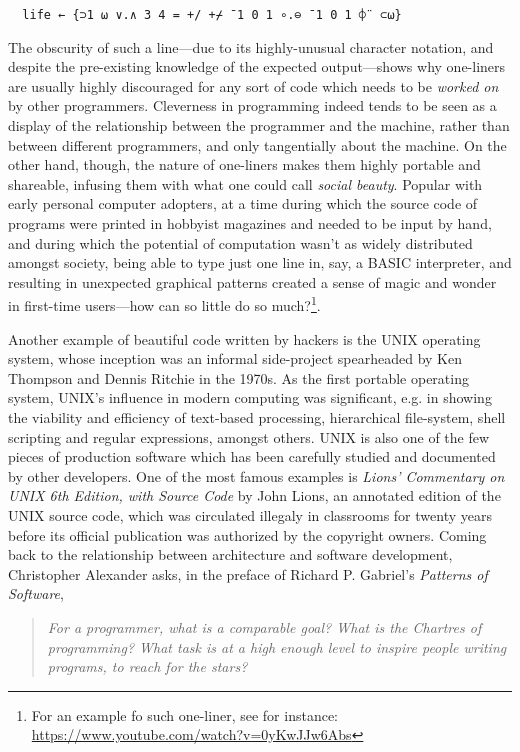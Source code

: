 \documentclass{article}
\begin{document}
\begin{verbatim}
  life ← {⊃1 ⍵ ∨.∧ 3 4 = +/ +⌿ ¯1 0 1 ∘.⊖ ¯1 0 1 ⌽¨ ⊂⍵}
\end{verbatim}

The obscurity of such a line—due to its highly-unusual character notation, and despite the pre-existing knowledge of the expected output—shows why one-liners are usually highly discouraged for any sort of code which needs to be \emph{worked on} by other programmers. Cleverness in programming indeed tends to be seen as a display of the relationship between the programmer and the machine, rather than between different programmers, and only tangentially about the machine. On the other hand, though, the nature of one-liners makes them highly portable and shareable, infusing them with what one could call \emph{social beauty}. Popular with early personal computer adopters, at a time during which the source code of programs were printed in hobbyist magazines and needed to be input by hand, and during which the potential of computation wasn't as widely distributed amongst society, being able to type just one line in, say, a BASIC interpreter, and resulting in unexpected graphical patterns created a sense of magic and wonder in first-time users—how can so little do so much?\footnote{For an example fo such one-liner, see for instance: \url{https://www.youtube.com/watch?v=0yKwJJw6Abs}}.

Another example of beautiful code written by hackers is the UNIX operating system, whose inception was an informal side-project spearheaded by Ken Thompson and Dennis Ritchie in the 1970s. As the first portable operating system, UNIX's influence in modern computing was significant, e.g. in showing the viability and efficiency of text-based processing, hierarchical file-system, shell scripting and regular expressions, amongst others. UNIX is also one of the few pieces of production software which has been carefully studied and documented by other developers. One of the most famous examples is \emph{Lions' Commentary on UNIX 6th Edition, with Source Code} by John Lions, an annotated edition of the UNIX source code, which was circulated illegaly in classrooms for twenty years before its official publication was authorized by the copyright owners\cite{lions_lions_1996}. Coming back to the relationship between architecture and software development, Christopher Alexander asks, in the preface of Richard P. Gabriel's \textit{Patterns of Software}\cite{gabriel_patterns_1998},

\begin{quote}
    \textit{For a programmer, what is a comparable goal? What is the Chartres of programming? What task is at a high enough level to inspire people writing programs, to reach for the stars?}
\end{quote}
\end{document}
